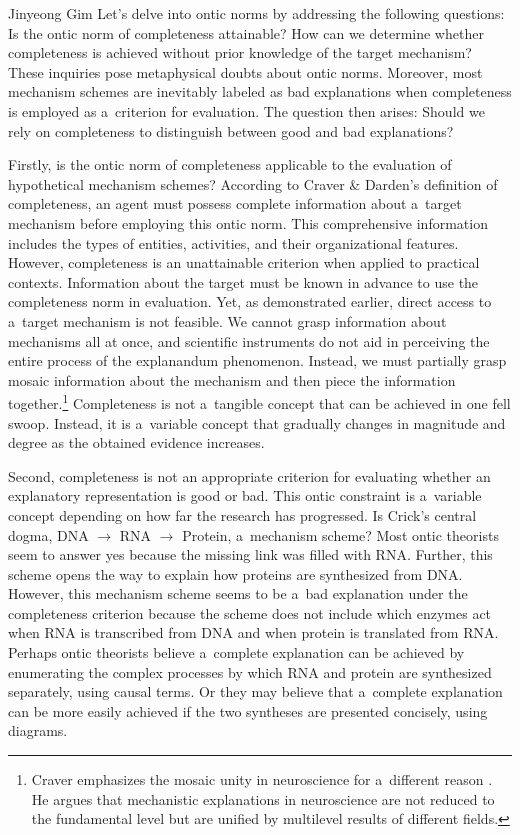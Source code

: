 \begin{artengenv}{Jinyeong Gim}
\enlargethispage{1.5\baselineskip}
Let's delve into ontic norms by addressing the following questions: Is the ontic norm of completeness attainable? How can we determine whether completeness is achieved without prior knowledge of the target mechanism? These inquiries pose metaphysical doubts about ontic norms. Moreover, most mechanism schemes are inevitably labeled as bad explanations when completeness is employed as a~criterion for evaluation. The question then arises: Should we rely on completeness to distinguish between good and bad explanations?

Firstly, is the ontic norm of completeness applicable to the evaluation of hypothetical mechanism schemes? According to Craver \& Darden's definition of completeness, an agent must possess complete information about a~target mechanism before employing this ontic norm. This comprehensive information includes the types of entities, activities, and their organizational features. However, completeness is an unattainable criterion when applied to practical contexts. Information about the target must be known in advance to use the completeness norm in evaluation. Yet, as demonstrated earlier, direct access to a~target mechanism is not feasible. We cannot grasp information about mechanisms all at once, and scientific instruments do not aid in perceiving the entire process of the explanandum phenomenon. Instead, we must partially grasp mosaic information about the mechanism and then piece the information together.\footnote{Craver emphasizes the mosaic unity in neuroscience for a~different reason
\parencite[see][]{craver_explaining_2007}. %
 He argues that mechanistic explanations in neuroscience are not reduced to the fundamental level but are unified by multilevel results of different fields.} Completeness is not a~tangible concept that can be achieved in one fell swoop. Instead, it is a~variable concept that gradually changes in magnitude and degree as the obtained evidence increases.

Second, completeness is not an appropriate criterion for evaluating whether an explanatory representation is good or bad. This ontic constraint is a~variable concept depending on how far the research has progressed. Is Crick's central dogma, DNA $\to$ RNA $\to$ Protein, a~mechanism scheme? Most ontic theorists seem to answer yes because the missing link was filled with RNA. Further, this scheme opens the way to explain how proteins are synthesized from DNA. However, this mechanism scheme seems to be a~bad explanation under the completeness criterion because the scheme does not include which enzymes act when RNA is transcribed from DNA and when protein is translated from RNA. Perhaps ontic theorists believe a~complete explanation can be achieved by enumerating the complex processes by which RNA and protein are synthesized separately, using causal terms. Or they may believe that a~complete explanation can be more easily achieved if the two syntheses are presented concisely, using diagrams.


\end{artengenv}
